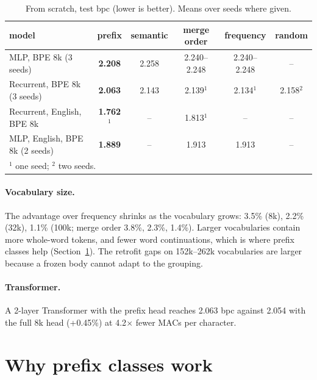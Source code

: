\documentclass[11pt]{article}
\begin{document}
\begin{table}[t]
\centering
\caption{From scratch, test bpc (lower is better). Means over seeds where given.}
\label{tab:scratch}
\begin{tabular}{lccccc}
\toprule
model & prefix & semantic & merge order & frequency & random \\
\midrule
MLP, BPE 8k (3 seeds) & \textbf{2.208} & 2.258 & 2.240--2.248 & 2.240--2.248 & -- \\
Recurrent, BPE 8k (3 seeds) & \textbf{2.063} & 2.143 & 2.139$^1$ & 2.134$^1$ & 2.158$^2$ \\
Recurrent, English, BPE 8k & \textbf{1.762}$^1$ & -- & 1.813$^1$ & -- & -- \\
MLP, English, BPE 8k (2 seeds) & \textbf{1.889} & -- & 1.913 & 1.913 & -- \\
\bottomrule
\multicolumn{6}{l}{\footnotesize $^1$ one seed; $^2$ two seeds.}
\end{tabular}
\end{table}

\paragraph{Vocabulary size.} The advantage over frequency shrinks as the vocabulary grows: 3.5\% (8k), 2.2\% (32k), 1.1\% (100k; merge order 3.8\%, 2.3\%, 1.4\%). Larger vocabularies contain more whole-word tokens, and fewer word continuations, which is where prefix classes help (Section~\ref{sec:why}). The retrofit gaps on 152k--262k vocabularies are larger because a frozen body cannot adapt to the grouping.

\paragraph{Transformer.} A 2-layer Transformer with the prefix head reaches 2.063 bpc against 2.054 with the full 8k head (+0.45\%) at 4.2$\times$ fewer MACs per character.

\section{Why prefix classes work}\label{sec:why}
\end{document}
